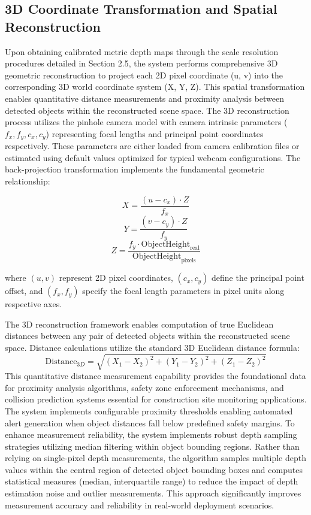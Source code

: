 \documentclass{article}
\begin{document}
\subsection{3D Coordinate Transformation and Spatial Reconstruction}
Upon obtaining calibrated metric depth maps through the scale resolution procedures detailed in Section 2.5, the system performs comprehensive 3D geometric reconstruction to project each 2D pixel coordinate (u, v) into the corresponding 3D world coordinate system (X, Y, Z). This spatial transformation enables quantitative distance measurements and proximity analysis between detected objects within the reconstructed scene space. The 3D reconstruction process utilizes the pinhole camera model with camera intrinsic parameters ($f_x, f_y, c_x, c_y$) representing focal lengths and principal point coordinates respectively. These parameters are either loaded from camera calibration files or estimated using default values optimized for typical webcam configurations. The back-projection transformation implements the fundamental geometric relationship:

\begin{equation}
X = \frac{(u - c_x) \cdot Z}{f_x}
\end{equation}
\begin{equation}
Y = \frac{(v - c_y) \cdot Z}{f_y}
\end{equation}
\begin{equation}
Z = \frac{f_y \cdot \text{ObjectHeight}_{\text{real}}}{\text{ObjectHeight}_{\text{pixels}}}
\end{equation}

where $(u, v)$ represent 2D pixel coordinates, $(c_x, c_y)$ define the principal point offset, and $(f_x, f_y)$ specify the focal length parameters in pixel units along respective axes.

The 3D reconstruction framework enables computation of true Euclidean distances between any pair of detected objects within the reconstructed scene space. Distance calculations utilize the standard 3D Euclidean distance formula:
\begin{equation}
\text{Distance}_{3D} = \sqrt{(X_1 - X_2)^2 + (Y_1 - Y_2)^2 + (Z_1 - Z_2)^2}
\end{equation}
This quantitative distance measurement capability provides the foundational data for proximity analysis algorithms, safety zone enforcement mechanisms, and collision prediction systems essential for construction site monitoring applications. The system implements configurable proximity thresholds enabling automated alert generation when object distances fall below predefined safety margins. To enhance measurement reliability, the system implements robust depth sampling strategies utilizing median filtering within object bounding regions. Rather than relying on single-pixel depth measurements, the algorithm samples multiple depth values within the central region of detected object bounding boxes and computes statistical measures (median, interquartile range) to reduce the impact of depth estimation noise and outlier measurements. This approach significantly improves measurement accuracy and reliability in real-world deployment scenarios.
\end{document}
